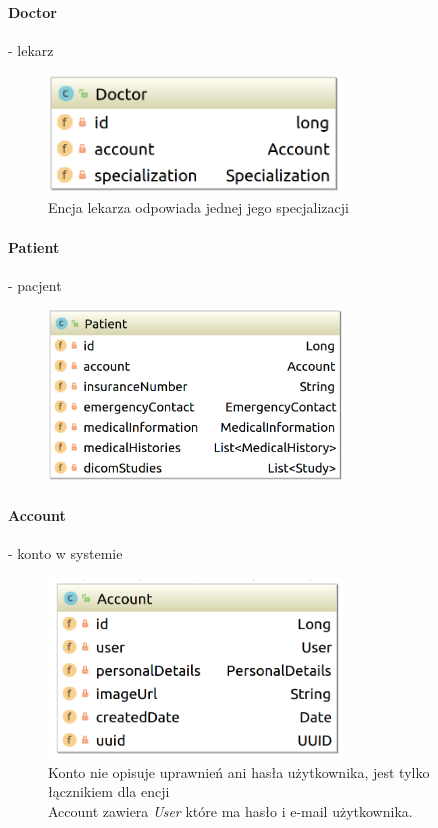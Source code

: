 \documentclass[polish,12pt]{aghthesis}
\begin{document}
    \paragraph{Doctor} - lekarz 
    \begin{figure}[H] 
    \includegraphics[width=0.7\textwidth]{Doctor} 
    \caption{Encja lekarza odpowiada jednej jego specjalizacji}
    \end{figure}
    \paragraph{Patient} - pacjent 
    \begin{figure}[H]
    \includegraphics[width=0.7\textwidth]{Patient}
    \end{figure}
    \paragraph{Account} - konto w systemie 
    \begin{figure}[H]
    \includegraphics[width=0.7\textwidth]{Account}
    \caption{Konto nie opisuje uprawnień ani hasła użytkownika, jest tylko łącznikiem dla encji \\
    Account zawiera \emph{User} które ma hasło i e-mail użytkownika.}
    \end{figure}
\end{document}
